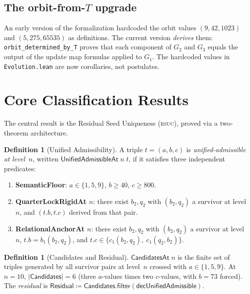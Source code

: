 \documentclass[11pt,a4paper]{article}
\theoremstyle{definition}
\newtheorem{definition}[theorem]{Definition}
\newcommand{\rsuc}{\textsc{rsuc}}
\begin{document}
\subsection{The orbit-from-$T$ upgrade}

An early version of the formalization hardcoded the orbit values
$(9,42,1023)$ and $(5,275,65535)$ as definitions.  The current version
\emph{derives} them: \texttt{orbit\_determined\_by\_T} proves that each
component of $G_2$ and $G_3$ equals the output of the update map
formulas applied to $G_1$.  The hardcoded values in
\texttt{Evolution.lean} are now corollaries, not postulates.

\section{Core Classification Results}\label{sec:classification}

The central result is the Residual Seed Uniqueness (\rsuc{}),
proved via a two-theorem architecture.

\begin{definition}[Unified Admissibility]\label{def:unified}
A triple $t = (a, b, c)$ is \emph{unified-admissible at level~$n$},
written $\mathsf{UnifiedAdmissibleAt}\;n\;t$, if it satisfies three
independent predicates:
\begin{enumerate}[nosep]
\item \textbf{SemanticFloor}: $a \in \{1, 5, 9\}$, $b \ge 40$,
  $c \ge 800$.
\item \textbf{QuarterLockRigidAt $n$}: there exist $b_2, q_2$ with
  $(b_2, q_2)$ a survivor at level~$n$, and $(t.b, t.c)$ derived from
  that pair.
\item \textbf{RelationalAnchorAt $n$}: there exist $b_2, q_2$ with
  $(b_2, q_2)$ a survivor at level~$n$, $t.b = b_1(b_2, q_2)$, and
  $t.c \in \{c_1(b_2, q_2),\; c_1(q_2, b_2)\}$.
\end{enumerate}
\end{definition}

\begin{definition}[Candidates and Residual]\label{def:candidates}
$\mathsf{CandidatesAt}\;n$ is the finite set of triples generated by
all survivor pairs at level~$n$ crossed with $a \in \{1, 5, 9\}$.
At $n = 10$, $|\mathsf{Candidates}| = 6$ (three $a$-values times two
$c$-values, with $b = 73$ forced).  The \emph{residual} is
$\mathsf{Residual} \coloneqq \mathsf{Candidates}.\mathsf{filter}
(\mathsf{decUnifiedAdmissible})$.
\end{definition}
\end{document}
